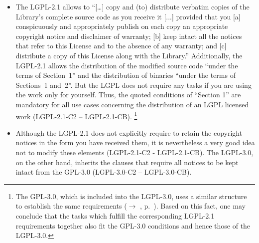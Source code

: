 \begin{itemize}
  
\item The LGPL-2.1 allows to \enquote{[\ldots] copy and (to) distribute
  verbatim copies of the Library's complete source code as you receive it [...]
  provided that you 
  [a] conspicuously and appropriately publish on each copy an appropriate
  copyright notice and disclaimer of warranty; 
  [b] keep intact all the notices that refer to this License and to the absence
  of any warranty; and 
  [c] distribute a copy of this License along with the Library.}
  Additionally, the LGPL-2.1 allows the distribution of the modified source code
  \enquote{under the terms of Section~1} and the distribution
  of binaries \enquote{under the terms of Sections~1 and~2}.
  But the LGPL does not require any tasks if you are using the work only for
  yourself. Thus, the quoted conditions of \enquote{Section 1} are mandatory for
  all use cases concerning the distribution of an LGPL licensed work
  (LGPL-2.1-C2 -- LGPL-2.1-CB).
  \footnote{The GPL-3.0, which is included into the LGPL-3.0, uses a similar
    structure to establish the same requirements ($\rightarrow$ \oslic, p.\ 
    \pageref{Gpl3ConditionsDistri}). Based on this fact, one may conclude that
    the tasks which fulfill the corresponding LGPL-2.1 requirements together
    also fit the GPL-3.0 conditions and hence those of the LGPL-3.0.}

\item Although the LGPL-2.1 does not explicitly require to retain the
  copyright notices in the form you have received them, it is nevertheless a
  very good idea not to modify these elements (LGPL-2.1-C2 - LGPL-2.1-CB). The
  LGPL-3.0, on the other hand, inherits the clauses that require all notices to
  be kept intact from the GPL-3.0 (LGPL-3.0-C2 -- LGPL-3.0-CB).\citeGPLthree{§4} 
  

\end{itemize}
